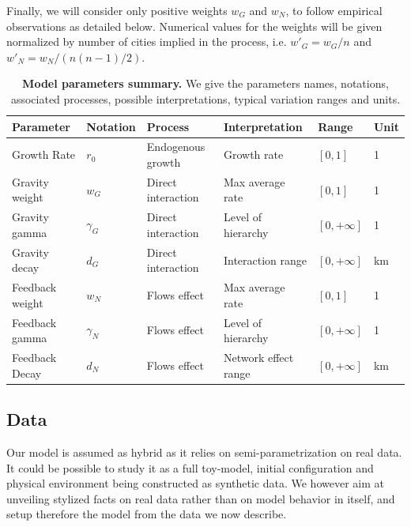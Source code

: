 \documentclass[Royal,sageh,times]{sagej}
\begin{document}
Finally, we will consider only positive weights $w_G$ and $w_N$, to follow empirical observations as detailed below. Numerical values for the weights will be given normalized by number of cities implied in the process, i.e. ${w'}_G = w_G / n$ and ${w'}_N = w_N / (n (n-1) / 2)$.



\begin{table}[ht]
\small\sf\centering
\caption{\textbf{Model parameters summary.} We give the parameters names, notations, associated processes, possible interpretations, typical variation ranges and units.}\label{tab:parameters}
\hspace{-0.5cm}
\begin{tabular}{|l|l|l|l|l|l|}
\toprule
Parameter & Notation & Process & Interpretation & Range & Unit\\
\midrule
Growth Rate & $r_0$ & Endogenous growth & Growth rate & $\left[ 0,1\right]$ & 1 \\
Gravity weight & $w_G$ & Direct interaction & Max average rate & $\left[ 0,1\right]$ & 1 \\
Gravity gamma & $\gamma_G$ & Direct interaction & Level of hierarchy & $\left[ 0,+\infty\right]$ & 1 \\
Gravity decay & $d_G$ & Direct interaction & Interaction range & $\left[ 0,+\infty\right]$ & km \\
Feedback weight & $w_N$ & Flows effect & Max average rate & $\left[ 0,1\right]$  & 1\\
Feedback gamma & $\gamma_N$ & Flows effect & Level of hierarchy & $\left[ 0,+\infty\right]$ & 1\\
Feedback Decay & $d_N$ & Flows effect & Network effect range & $\left[ 0,+\infty\right]$ & km \\
\bottomrule
\end{tabular}
\end{table}



\subsection*{Data}


Our model is assumed as hybrid as it relies on semi-parametrization on real data. It could be possible to study it as a full toy-model, initial configuration and physical environment being constructed as synthetic data. We however aim at unveiling stylized facts on real data rather than on model behavior in itself, and setup therefore the model from the data we now describe.
\end{document}
